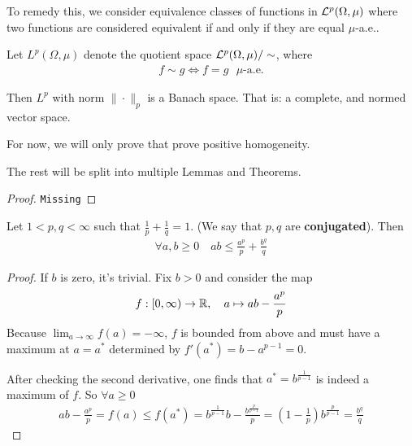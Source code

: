 To remedy this, we consider equivalence classes of functions in $\mathcal{L}^{p}(\Omega,\mu)$ where two functions are considered equivalent if and only if they are equal $\mu$-a.e..

\begin{thm}[]\label{thm:lp-is-banach-space}
  Let $L^{p}(\Omega,\mu)$ denote the quotient space $\mathcal{L}^{p}(\Omega,\mu)/\sim$, where
  \begin{align*}
    f \sim g \iff f=g \text{ $\mu$-a.e.}
  \end{align*}

  Then $L^{p}$ with norm $\|\cdot\|_p$ is a Banach space. That is: a complete, and normed vector space.
\end{thm}
For now, we will only prove that prove positive homogeneity.

The rest will be split into multiple Lemmas and Theorems.

\begin{proof}[Proof]
  \texttt{Missing}
\end{proof}



\begin{lem}
  Let $1 < p,q < \infty$ such that $\frac{1}{p} + \frac{1}{q} = 1$. (We say that $p,q$ are \textbf{conjugated}).
  Then
  \begin{align*}
    \forall  a,b \geq 0 \quad ab \leq \frac{a^{p}}{p} + \frac{b^{q}}{q}
  \end{align*}
\end{lem}
\begin{proof}
If $b$ is zero, it's trivial.
Fix $b > 0$ and
consider the map
\begin{align*}
  f: [0,\infty) \to \mathbb{R}, \quad a \mapsto ab - \frac{a^{p}}{p}
\end{align*}
Because $\lim_{a \to \infty} f(a) = -\infty$, $f$ is bounded from above and must have a maximum at $a = a^{\ast}$ determined by $f'(a^{\ast}) = b- a^{p-1} = 0$.

After checking the second derivative, 
one finds that $a^{\ast} = b^{\frac{1}{p-1}}$ is indeed a maximum of $f$. So $\forall a \geq 0$
\begin{align*}
  ab - \frac{a^{p}}{p} = f(a) \leq f(a^{\ast}) = b^{\frac{1}{p-1}}b - \frac{b^{\frac{p}{p-1}}}{p} = \left(
    1 - \frac{1}{p}
  \right)
  b^{\frac{p}{p-1}}
  = 
  \frac{b^{q}}{q}
\end{align*}
\end{proof}


